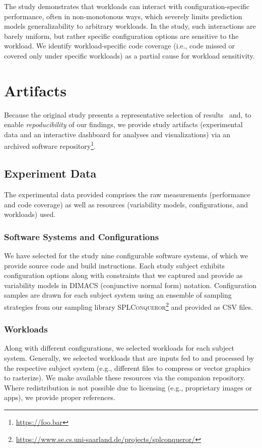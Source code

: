 \documentclass[10pt,conference]{IEEEtran}
\begin{document}
	The study demonstrates that workloads can interact with configuration-specific performance, often in non-monotonous ways, which severely limits prediction models generalizability to arbitrary workloads. In the study, such interactions are barely uniform, but rather specific configuration options are sensitive to the workload. We identify workload-specific code coverage (i.e., code missed or covered only  under specific workloads) as a partial cause for workload sensitivity.
	
	\section{Artifacts}
	Because the original study presents a representative selection of results~\cite{muhlbauer_workload_2023} and, to enable \textit{repoducibility} of our findings, we provide study artifacts (experimental data and an interactive dashboard for analyses and visualizations) via an archived software repository\footnote{\url{https://foo.bar}}.

	\subsection{Experiment Data}
	The experimental data provided comprises the raw measurements (performance and code coverage) as well as resources (variability models, configurations, and workloads) used.
	
\subsubsection{Software Systems and Configurations}
	We have selected for the study nine configurable software systems, of which we provide source code and build instructions. Each study subject exhibits configuration options along with constraints that we captured and provide as variability models in DIMACS (conjunctive normal form) notation. Configuration samples are drawn for each subject system using an ensemble of sampling strategies from our sampling library \textsc{SPLConqueror}\footnote{\url{https://www.se.cs.uni-saarland.de/projects/splconqueror/}} and provided as CSV files.
	
	\subsubsection{Workloads}
	Along with different configurations, we selected workloads for each subject system. Generally, we selected workloads that are inputs fed to and processed by the respective subject system (e.g., different files to compress or vector graphics to rasterize). We make available these resources via the companion repository. {\color{orange}Where redistribution is not possible due to licensing (e.g., proprietary images or apps), we provide proper references}. 
	
\end{document}
